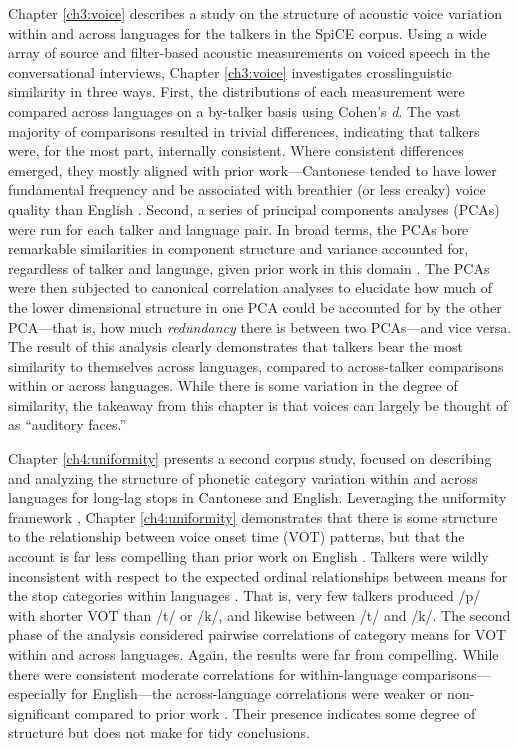 Chapter \ref{ch3:voice} describes a study on the structure of acoustic voice variation within and across languages for the talkers in the SpiCE corpus. Using a wide array of source and filter-based acoustic measurements on voiced speech in the conversational interviews, Chapter \ref{ch3:voice} investigates crosslinguistic similarity in three ways. First, the distributions of each measurement were compared across languages on a by-talker basis using Cohen's \textit{d}. The vast majority of comparisons resulted in trivial differences, indicating that talkers were, for the most part, internally consistent. Where consistent differences emerged, they mostly aligned with prior work---Cantonese tended to have lower fundamental frequency and be associated with breathier (or less creaky) voice quality than English \citep{ng_2012_ltas}. Second, a series of principal components analyses (PCAs) were run for each talker and language pair. In broad terms, the PCAs bore remarkable similarities in component structure and variance accounted for, regardless of talker and language, given prior work in this domain \citep{lee_2019_acoustic, lee_2019_spontaneous, lee_2020_language}. The PCAs were then subjected to canonical correlation analyses to elucidate how much of the lower dimensional structure in one PCA could be accounted for by the other PCA---that is, how much \textit{redundancy} there is between two PCAs---and vice versa. The result of this analysis clearly demonstrates that talkers bear the most similarity to themselves across languages, compared to across-talker comparisons within or across languages. While there is some variation in the degree of similarity, the takeaway from this chapter is that voices can largely be thought of as ``auditory faces.''

Chapter \ref{ch4:uniformity} presents a second corpus study, focused on describing and analyzing the structure of phonetic category variation within and across languages for long-lag stops in Cantonese and English. Leveraging the uniformity framework \citep{chodroff_2017_structure}, Chapter \ref{ch4:uniformity} demonstrates that there is some structure to the relationship between voice onset time (VOT) patterns, but that the account is far less compelling than prior work on English \citep{chodroff_2017_structure, chodroff_2019_l2}. Talkers were wildly inconsistent with respect to the expected ordinal relationships between means for the stop categories within languages \citep{chodroff_2017_structure, cho_1999_vot, lisker_1964_vot}. That is, very few talkers produced /p/ with shorter VOT than /t/ or /k/, and likewise between /t/ and /k/. The second phase of the analysis considered pairwise correlations of category means for VOT within and across languages. Again, the results were far from compelling. While there were consistent moderate correlations for within-language comparisons---especially for English---the across-language correlations were weaker or non-significant compared to prior work \citep{chodroff_2017_structure, chodroff_2019_l2}. Their presence indicates some degree of structure but does not make for tidy conclusions. 

